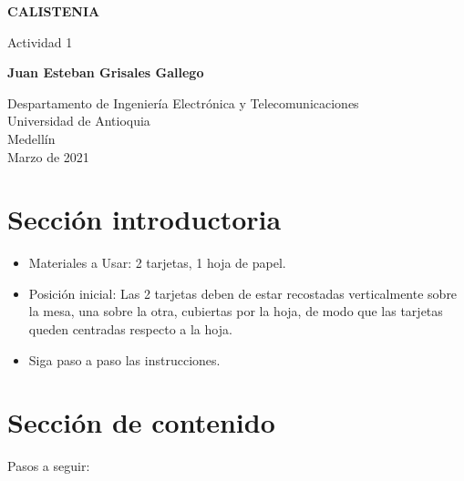 \documentclass{article}
\begin{document}
\begin{titlepage}
    \begin{center}
        \vspace*{1cm}
            
        \Huge
        \textbf{CALISTENIA}
            
        \vspace{0.5cm}
        \LARGE
        Actividad 1
            
        \vspace{1.5cm}
            
        \textbf{Juan Esteban Grisales Gallego}
            
        \vfill
            
        \vspace{0.8cm}
            
        \Large
        Despartamento de Ingeniería Electrónica y Telecomunicaciones\\
        Universidad de Antioquia\\
        Medellín\\
        Marzo de 2021
            
    \end{center}
\end{titlepage}

\tableofcontents
\newpage
\section{Sección introductoria}\label{intro}


\begin{itemize}
    \item Materiales a Usar: 2 tarjetas, 1 hoja de papel.
    \item Posición inicial: Las 2 tarjetas deben de estar recostadas verticalmente sobre la mesa, una sobre la otra, cubiertas por la hoja, de modo que las tarjetas queden centradas respecto a la hoja.
    \item Siga paso a paso las instrucciones.

\end{itemize}

\section{Sección de contenido} \label{contenido}



Pasos a seguir:
\end{document}
